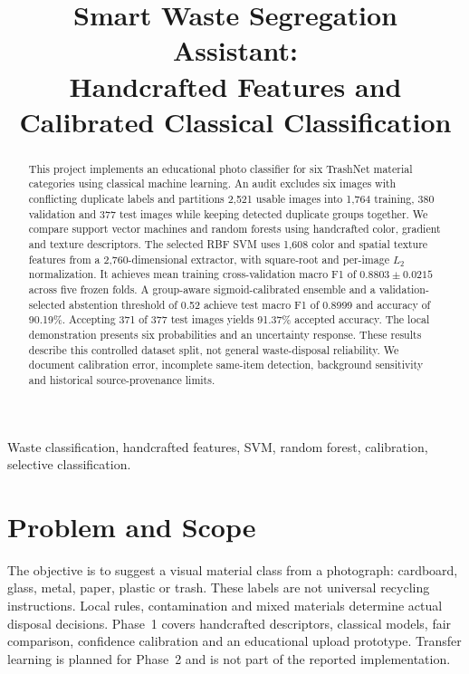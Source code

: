 \documentclass[conference]{IEEEtran}
\begin{document}
\title{Smart Waste Segregation Assistant:\\Handcrafted Features and Calibrated Classical Classification}
\author{
}
\maketitle
\pagestyle{plain}
\thispagestyle{plain}
\begin{abstract}
This project implements an educational photo classifier for six TrashNet material categories using classical machine learning. An audit excludes six images with conflicting duplicate labels and partitions 2,521 usable images into 1,764 training, 380 validation and 377 test images while keeping detected duplicate groups together. We compare support vector machines and random forests using handcrafted color, gradient and texture descriptors. The selected RBF SVM uses 1,608 color and spatial texture features from a 2,760-dimensional extractor, with square-root and per-image $L_2$ normalization. It achieves mean training cross-validation macro F1 of $0.8803\pm0.0215$ across five frozen folds. A group-aware sigmoid-calibrated ensemble and a validation-selected abstention threshold of 0.52 achieve test macro F1 of 0.8999 and accuracy of 90.19\%. Accepting 371 of 377 test images yields 91.37\% accepted accuracy. The local demonstration presents six probabilities and an uncertainty response. These results describe this controlled dataset split, not general waste-disposal reliability. We document calibration error, incomplete same-item detection, background sensitivity and historical source-provenance limits.
\end{abstract}
\begin{IEEEkeywords}
Waste classification, handcrafted features, SVM, random forest, calibration, selective classification.
\end{IEEEkeywords}

\section{Problem and Scope}
The objective is to suggest a visual material class from a photograph: cardboard, glass, metal, paper, plastic or trash. These labels are not universal recycling instructions. Local rules, contamination and mixed materials determine actual disposal decisions. Phase~1 covers handcrafted descriptors, classical models, fair comparison, confidence calibration and an educational upload prototype. Transfer learning is planned for Phase~2 and is not part of the reported implementation.
\end{document}
